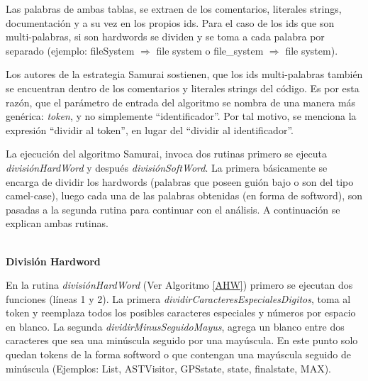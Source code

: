 Las palabras de ambas tablas, se extraen de los comentarios, literales strings, documentación y a su vez en los propios ids. Para el caso de los ids que son multi-palabras, si son hardwords se dividen y se toma a cada palabra por separado (ejemplo: \textsf{fileSystem} $\Rightarrow$ \textsf{file system} o \textsf{file\_system} $\Rightarrow$ \textsf{file system}).

Los autores de la estrategia Samurai sostienen, que los ids multi-palabras también se encuentran dentro de los comentarios y literales strings del código. Es por esta razón, que el parámetro de entrada del algoritmo se nombra de una manera más genérica: \textit{token}, y no simplemente “identificador”. Por tal motivo, se menciona la expresión “dividir al token”, en lugar del “dividir al identificador”.




La ejecución del algoritmo Samurai, invoca dos rutinas primero se ejecuta \mbox{\textit{divisiónHardWord}} y después \mbox{\textit{divisiónSoftWord}}. La primera básicamente se encarga de dividir los hardwords (palabras que poseen guión bajo o son del tipo camel-case), luego cada una de las palabras obtenidas (en forma de softword), son pasadas a la segunda rutina para continuar con el análisis. A continuación se explican ambas rutinas.

\noindent \textbf{\\División Hardword\\}

En la rutina \textit{divisiónHardWord} (Ver Algoritmo \ref{AHW}) primero se ejecutan dos funciones (líneas 1 y 2). La primera \textit{dividirCaracteresEspecialesDigitos}, toma al token y reemplaza todos los posibles caracteres especiales y números por espacio en blanco. La segunda \mbox{\textit{dividirMinusSeguidoMayus}}, agrega un blanco entre dos caracteres que sea una minúscula seguido por una mayúscula. En este punto solo quedan tokens de la forma softword o que contengan una mayúscula seguido de minúscula (Ejemplos: \textsf{List, ASTVisitor, GPSstate, state, finalstate, MAX}).

